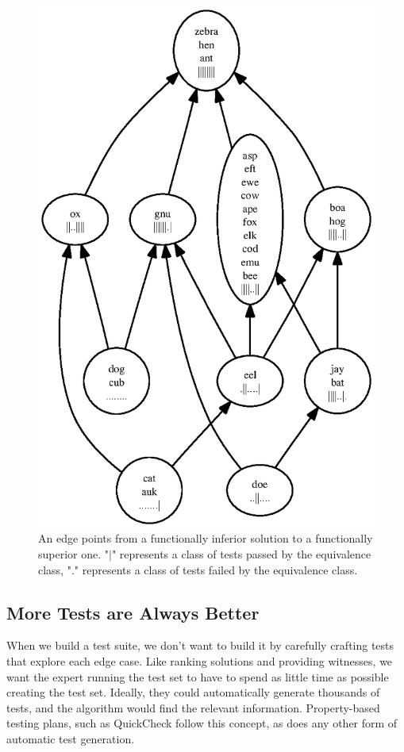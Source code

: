 \documentclass[11pt,twoside]{article}
\theoremstyle{definition}
\let\cite=\citep
\begin{document}
\begin{figure}
\centering
\includegraphics{rank1.ps}
\caption{An edge points from a functionally inferior solution to a functionally superior one. "$\vert$" represents a class of tests passed by the equivalence class, "." represents a class of tests failed by the equivalence class.}
\end{figure}

\subsection{More Tests are Always Better}
When we build a test suite, we don't want to build it by carefully crafting tests that explore each edge case. Like ranking solutions and providing witnesses, we want the expert running the test set to have to spend as little time as possible creating the test set. Ideally, they could automatically generate thousands of tests, and the algorithm would find the relevant information. Property-based testing plans, such as QuickCheck \cite{QuickCheck} follow this concept, as does any other form of automatic test generation.
\end{document}

